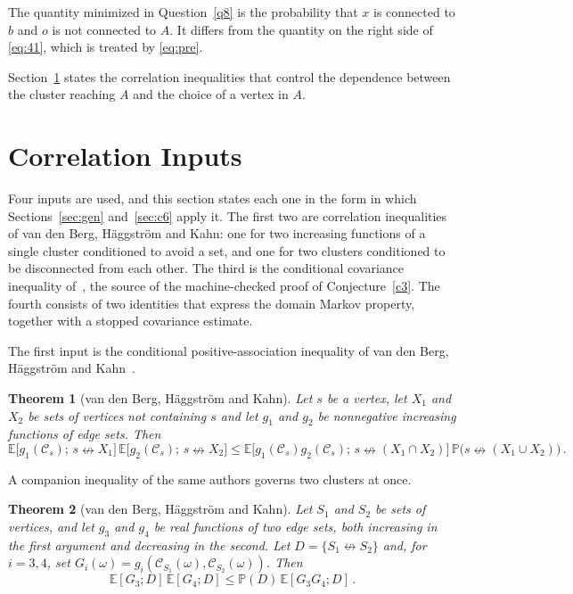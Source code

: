 \documentclass[11pt]{article}
\newtheorem{theorem}{Theorem}[section]
\theoremstyle{definition}
\theoremstyle{remark}
\newcommand{\PP}{\mathbb P}
\newcommand{\EE}{\mathbb E}
\newcommand{\ncon}{\nleftrightarrow}
\newcommand{\eC}{\mathcal C}
\begin{document}
The quantity minimized in Question~\ref{q8} is the probability that $x$ is connected to
$b$ and $o$ is not connected to $A$. It differs from the quantity on the right side of
\eqref{eq:41}, which is treated by \eqref{eq:pre}.

Section~\ref{sec:inputs} states the correlation inequalities that control the dependence
between the cluster reaching $A$ and the choice of a vertex in $A$.

\section{Correlation Inputs}\label{sec:inputs}

Four inputs are used, and this section states each one in the form in which
Sections~\ref{sec:gen} and~\ref{sec:c6} apply it. The first two are correlation
inequalities of van den Berg, H\"aggstr\"om and Kahn: one for two increasing functions of a
single cluster conditioned to avoid a set, and one for two clusters conditioned to be
disconnected from each other. The third is the conditional covariance inequality
of~\cite{Dev}, the source of the machine-checked proof of Conjecture~\ref{c3}. The fourth
consists of two identities that express the domain Markov property, together with a stopped
covariance estimate.

The first input is the conditional positive-association inequality of van den Berg,
H\"aggstr\"om and Kahn~\cite{BHK}.

\begin{theorem}[van den Berg, H\"aggstr\"om and Kahn]\label{thm:bhk}
Let $s$ be a vertex, let $X_1$ and $X_2$ be sets of vertices not containing $s$ and let
$g_1$ and $g_2$ be nonnegative increasing functions of edge sets. Then
\[
 \EE\bigl[g_1(\eC_s);\,s\ncon X_1\bigr]\,\EE\bigl[g_2(\eC_s);\,s\ncon X_2\bigr]
\leq \EE\bigl[g_1(\eC_s)g_2(\eC_s);\,s\ncon (X_1\cap X_2)\bigr]\,
       \PP\bigl(s\ncon (X_1\cup X_2)\bigr)\,.
\]
\end{theorem}

A companion inequality of the same authors governs two clusters at once.

\begin{theorem}[van den Berg, H\"aggstr\"om and Kahn]\label{thm:bhk2}
Let $S_1$ and $S_2$ be sets of vertices, and let $g_3$ and $g_4$ be real functions of two
edge sets, both increasing in the first argument and decreasing in the second. Let
$D=\{S_1\ncon S_2\}$ and, for $i=3,4$, set
$G_i(\omega)=g_i(\eC_{S_1}(\omega),\eC_{S_2}(\omega))$. Then
\[
 \EE[G_3;D]\,\EE[G_4;D]\leq \PP(D)\,\EE[G_3G_4;D]\,.
\]
\end{theorem}
\end{document}
